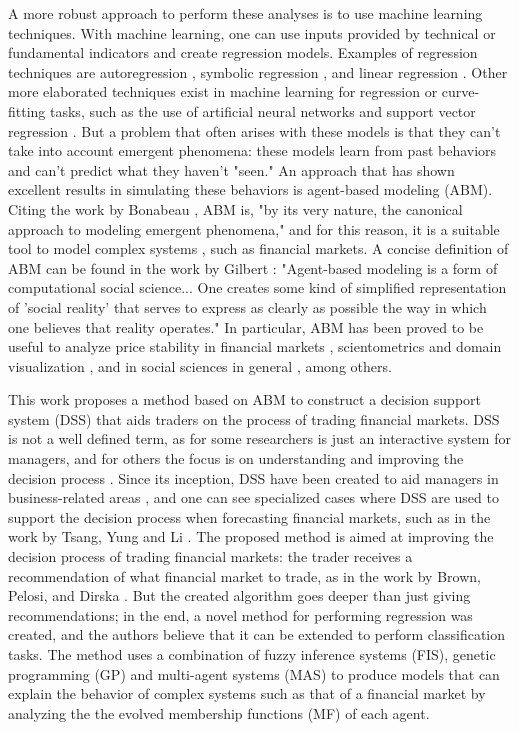 \documentclass[a4paper,twoside]{article}
\begin{document}
A more robust approach to perform these analyses is to use machine learning techniques. With machine learning, one can use inputs provided by technical or fundamental indicators and create regression models. Examples of regression techniques are autoregression \cite{burg1968new}, symbolic regression \cite{billard2002symbolic}, and linear regression \cite{kutner2004applied}. Other more elaborated techniques exist in machine learning for regression or curve-fitting tasks, such as the use of artificial neural networks \cite{melin2007hybrid} and support vector regression \cite{basak2007support}. But a problem that often arises with these models is that they can't take into account emergent phenomena: these models learn from past behaviors and can't predict what they haven't "seen." An approach that has shown excellent results in simulating these behaviors is agent-based modeling (ABM). Citing the work by Bonabeau \cite{bonabeau2002agent}, ABM is, "by its very nature, the canonical approach to modeling emergent phenomena," and for this reason, it is a suitable tool to model complex systems \cite{jennings2001agent}, such as financial markets. A concise definition of ABM can be found in the work by Gilbert \cite{gilbert2008agent}: "Agent-based modeling is a form of computational social science... One creates some kind of simplified representation of 'social reality' that serves to express as clearly as possible the way in which one believes that reality operates." In particular, ABM has been proved to be useful to analyze price stability in financial markets \cite{Pellizzari2007}, scientometrics and domain visualization \cite{Niazi2011}, and in social sciences in general \cite{gilbert2008agent}, among others.

This work proposes a method based on ABM to construct a decision support system (DSS) that aids traders on the process of trading financial markets. DSS is not a well defined term, as for some researchers is just an interactive system for managers, and for others the focus is on understanding and improving the decision process \cite{keen1980decision}. Since its inception, DSS have been created to aid managers in business-related areas \cite{Sprague1980} \cite{little1979decision}, and one can see specialized cases where DSS are used to support the decision process when forecasting financial markets, such as in the work by Tsang, Yung and Li \cite{Tsang2004}. The proposed method is aimed at improving the decision process of trading financial markets: the trader receives a recommendation of what financial market to trade, as in the work by Brown, Pelosi, and Dirska \cite{brown2013dynamic}. But the created algorithm goes deeper than just giving recommendations; in the end, a novel method for performing regression was created, and the authors believe that it can be extended to perform classification tasks. The method uses a combination of fuzzy inference systems (FIS), genetic programming (GP) \cite{poli2008field} \cite{Koza1992} and multi-agent systems (MAS) \cite{Shoham2009} to produce models that can explain the behavior of complex systems such as that of a financial market by analyzing the the evolved membership functions (MF) of each agent.
\end{document}
